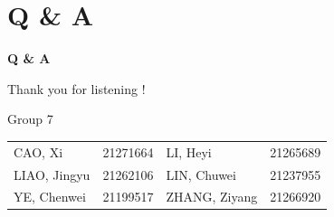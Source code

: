 \documentclass[serif, aspectratio=169]{beamer}
\begin{document}












\section{Q \& A}
\begin{frame}
    \huge
    \begin{center}
        \textbf{Q \& A}
    \end{center}
\end{frame}


\begin{frame}

\begin{center}
{ 
    \huge
    Thank you for listening !
    \normalsize
}
\vspace{1cm}

Group 7 \\[3em]

\scriptsize
\begin{tabular}{llll}
    \toprule
    CAO, Xi & 21271664 & LI, Heyi & 21265689  \\
    LIAO, Jingyu & 21262106 & LIN, Chuwei & 21237955  \\
    YE, Chenwei & 21199517 & ZHANG, Ziyang & 21266920  \\
    \bottomrule
\end{tabular}
\normalsize
\end{center}
\end{frame}
\end{document}
